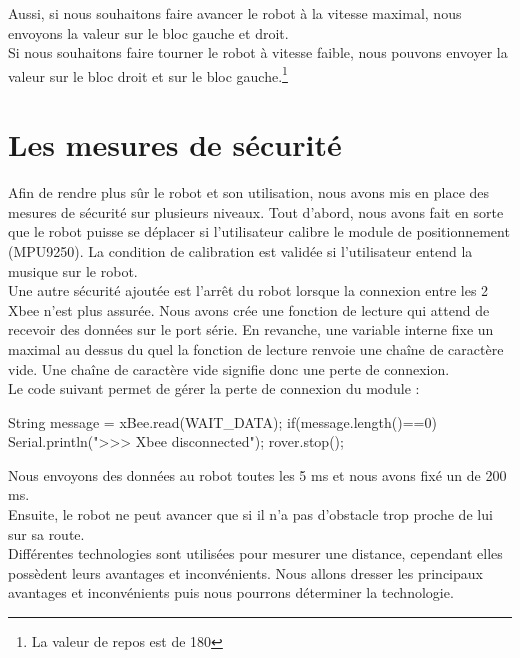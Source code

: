Aussi, si nous souhaitons faire avancer le robot à la vitesse maximal, nous envoyons la valeur  sur le bloc gauche et droit. \\
Si nous souhaitons faire tourner le robot à vitesse faible, nous pouvons envoyer la valeur  sur le bloc droit et  sur le bloc gauche.\footnote{La valeur de repos est de 180}

\section{Les mesures de sécurité}

Afin de rendre plus sûr le robot et son utilisation, nous avons mis en place des mesures de sécurité sur plusieurs niveaux.
Tout d'abord, nous avons fait en sorte que le robot puisse se déplacer  si l'utilisateur calibre le module de positionnement (MPU9250). La condition de calibration est validée si l'utilisateur entend la musique sur le robot.\\

Une autre sécurité ajoutée est l'arrêt du robot lorsque la connexion entre les 2 Xbee n'est plus assurée.
Nous avons crée une fonction de lecture qui attend de recevoir des données sur le port série. En revanche, une variable interne fixe un  maximal au dessus du quel la fonction de lecture renvoie une chaîne de caractère vide. Une chaîne de caractère vide signifie donc une perte de connexion.\\
Le code suivant permet de gérer la perte de connexion du module : 

\begin{Cpp}
  String message = xBee.read(WAIT_DATA);  
  if(message.length()==0)
  {
    Serial.println(">>> Xbee disconnected");
    rover.stop();
  }
\end{Cpp}

Nous envoyons des données au robot toutes les 5 ms et nous avons fixé un  de 200 ms.\\

Ensuite, le robot ne peut avancer que si il n'a pas d'obstacle trop proche de lui sur sa route.\\
Différentes technologies sont utilisées pour mesurer une distance, cependant elles possèdent leurs avantages et inconvénients. Nous allons dresser les principaux avantages et inconvénients puis nous pourrons déterminer la technologie.


